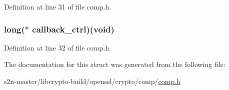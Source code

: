 Definition at line 31 of file comp.\+h.

\subsubsection[{\texorpdfstring{callback\+\_\+ctrl}{callback_ctrl}}]{\setlength{\rightskip}{0pt plus 5cm}long($\ast$ callback\+\_\+ctrl)({\bf void})}\hypertarget{structcomp__method__st_a3c5e5970b8ec99724cb34c1110e23780}{}\label{structcomp__method__st_a3c5e5970b8ec99724cb34c1110e23780}


Definition at line 32 of file comp.\+h.



The documentation for this struct was generated from the following file\+:\begin{DoxyCompactItemize}
\item 
s2n-\/master/libcrypto-\/build/openssl/crypto/comp/\hyperlink{crypto_2comp_2comp_8h}{comp.\+h}\end{DoxyCompactItemize}
